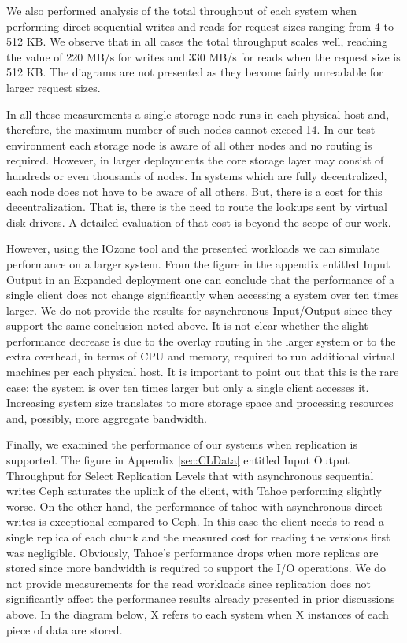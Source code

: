 \documentclass[11pt]{article}
\begin{document}
We also performed analysis of the total throughput of each system 
when performing direct sequential writes and reads for request sizes 
ranging from 4 to 512 KB. We observe that in all cases the total 
throughput scales well, reaching the value of 220 MB/s for writes 
and 330 MB/s for reads when the request size is 512 KB. The diagrams 
are not presented as they become fairly unreadable for larger 
request sizes. 

In all these measurements a single storage node runs in each physical 
host and, therefore, the maximum number of such nodes cannot exceed 
14.  In our test environment each storage node is aware of all other 
nodes and no routing is required. However, in larger deployments the 
core storage layer may consist of hundreds or even thousands of nodes. 
In systems which are fully decentralized, each node does not have to 
be aware of all others. But, there is a cost for this decentralization. 
That is, there is the need to route the lookups sent by virtual disk 
drivers. A detailed evaluation of that cost is beyond the scope of our 
work.

However, using the IOzone tool and the presented workloads we can 
simulate performance on a larger system. From the figure in the appendix 
entitled Input Output in an Expanded deployment one can conclude that the 
performance of a single client does not change significantly when 
accessing a system over ten times larger. We do not provide the results 
for asynchronous Input/Output since they support the same conclusion 
noted above. It is not clear whether the slight performance decrease 
is due to the overlay routing in the larger system or to the extra 
overhead, in terms of CPU and memory, required to run additional 
virtual machines per each physical host. It is important to point out 
that this is the rare case: the system is over ten times larger but 
only a single client accesses it. Increasing system size translates 
to more storage space and processing resources and, possibly, more 
aggregate bandwidth.

Finally, we examined the performance of our systems when replication is 
supported. The figure in Appendix \ref{sec:CLData} entitled Input Output Throughput 
for Select Replication Levels that with asynchronous sequential writes 
Ceph saturates the uplink of the client, with Tahoe performing slightly 
worse. On the other hand, the performance of tahoe with asynchronous 
direct writes is exceptional compared to Ceph.  In this case the client 
needs to read a single replica of each chunk and the measured cost for 
reading the versions first was negligible.  Obviously, Tahoe’s performance 
drops when more replicas are stored since more bandwidth is required to 
support the I/O operations. We do not provide measurements for the read 
workloads since replication does not significantly affect the performance 
results already presented in prior discussions above. In the diagram below, 
X refers to each system when X instances of each piece of data are stored.
\end{document}

